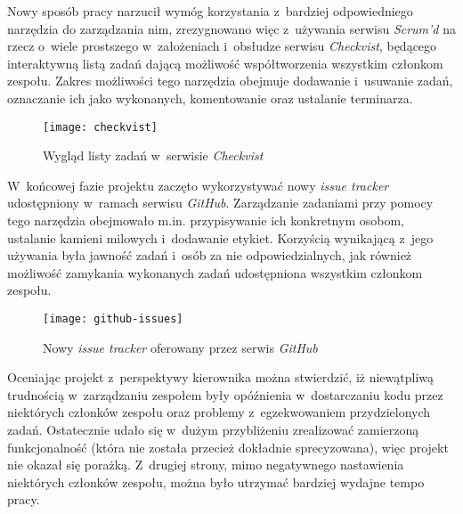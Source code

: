 Nowy sposób pracy narzucił wymóg korzystania z~bardziej odpowiedniego narzędzia
do zarządzania nim, zrezygnowano więc z~używania serwisu \emph{Scrum'd} na rzecz
o~wiele prostszego w~założeniach i~obsłudze serwisu \emph{Checkvist}, będącego
interaktywną listą zadań dającą możliwość współtworzenia wszystkim członkom
zespołu. Zakres możliwości tego narzędzia obejmuje dodawanie i~usuwanie zadań,
oznaczanie ich jako wykonanych, komentowanie oraz ustalanie terminarza.

\begin{figure}[ht]
	\centering
		\texttt{[image: checkvist]}
	\caption{Wygląd listy zadań w~serwisie \emph{Checkvist}}
	\label{fig:checkvist}
\end{figure}

W~końcowej fazie projektu zaczęto wykorzystywać nowy \emph{issue tracker}
udostępniony w~ramach serwisu \emph{GitHub}. Zarządzanie zadaniami przy pomocy
tego narzędzia obejmowało m.in. przypisywanie ich konkretnym osobom, ustalanie
kamieni milowych i~dodawanie etykiet. Korzyścią wynikającą z~jego używania była
jawność zadań i~osób za nie odpowiedzialnych, jak również możliwość zamykania
wykonanych zadań udostępniona wszystkim członkom zespołu.

\begin{figure}[ht]
	\centering
		\texttt{[image: github-issues]}
	\caption{Nowy \emph{issue tracker} oferowany przez serwis \emph{GitHub}}
	\label{fig:github-issues}
\end{figure}

Oceniając projekt z~perspektywy kierownika można stwierdzić, iż niewątpliwą
trudnością w~zarządzaniu zespołem były opóźnienia w~dostarczaniu kodu przez
niektórych członków zespołu oraz problemy z~egzekwowaniem przydzielonych zadań.
Ostatecznie udało się w~dużym przybliżeniu zrealizować zamierzoną
funkcjonalność (która nie została przecież dokładnie sprecyzowana), więc
projekt nie okazał się porażką. Z~drugiej strony, mimo negatywnego nastawienia
niektórych członków zespołu, można było utrzymać bardziej wydajne tempo pracy.
